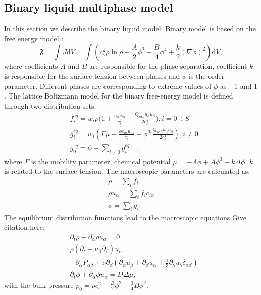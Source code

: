 \documentclass[mathpazo,sort,numbers]{cicp}
\begin{document}
\subsection{Binary liquid multiphase model}
In this section we describe the binary liquid model. Binary model is based on
the free energy model \cite{swift,landau}:
\begin{equation}
\mathfrak{F}=\int{J \mathrm{d}V}=\int{\left(c_s^2\rho\ln\rho+\frac{A}{2}\phi^2+\frac{B}{4}\phi^4 + \frac{k}{2}(\nabla \phi)^2 \right)\mathrm{d}V},
\end{equation}
where coefficients $A$ and $B$ are responsible for the phase separation,
coefficient $k$ is responsible for the surface tension between phases and
$\phi$ is the order parameter. Different phases are corresponding to
extreme values of $\phi$ as $-1$ and $1$.
The lattice Boltzmann model for the binary free-energy model is defined
through two distribution sets:
\begin{equation}
\begin{aligned}
&f_i^{eq}=w_i \rho \biggl(1+\frac{u_{\alpha}c_{i\alpha}}{c_s^2}+\frac{Q_{i\alpha\beta}u_{\alpha}u_{\beta}}{2 c_s^4}\biggr), i=0\div8\\
&g_i^{eq}=w_i(\Gamma \mu + \frac{\phi c_{i\alpha} u_{i\alpha}}{c_s^2}+\phi^m \frac{Q_{i\alpha\beta}u_{\alpha}u_{\beta}}{2 c_s^4}), i\neq0 \\
&g_0^{eq}=\phi-\sum_{i\neq0}{g_i^{eq}}\quad,
\end{aligned}
\end{equation}
where $\Gamma$ is the mobility parameter, chemical potential
$\mu=-A\phi+A\phi^3-k\Delta\phi$, $k$ is related to the surface
tension. The macroscopic parameters are calculated as:
\begin{equation}
\begin{aligned}
\rho=\sum_i{f_i}\\
\rho u_{\alpha}=\sum_i{f_i c_{i\alpha}}\\
\phi=\sum_i{g_i}
\end{aligned}
\end{equation}
The equilibrium distribution functions lead to the macroscopic equations
{\color{red} Give citation here}:
\begin{equation}
\begin{aligned}
&\partial_t \rho+ \partial_{\alpha} \rho u_{\alpha}=0\\
&\rho\left(\partial_t+u_{\beta}\partial_{\beta}\right) u_{\alpha}=\\
&-\partial_{\alpha}P_{\alpha \beta} + \nu\partial_{\beta}\left(\partial_{\alpha}u_{\beta}+\partial_{\beta} u_{\alpha} + \frac{1}{3}\partial_{\gamma} u_{\gamma} \delta_{\alpha\beta}\right)\\
&\partial_t \phi + \partial_{\alpha} \phi u_{\alpha}=D\Delta \mu,
\end{aligned}
\label{binary:fluid:system}
\end{equation}
with the bulk pressure $p_0=\rho c_s^2-\frac{B}{2}\phi^2+\frac{3}{4}B \phi^2$.
\end{document}
